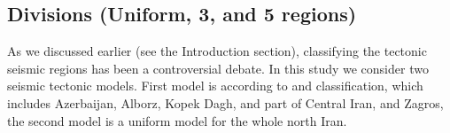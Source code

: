 \subsection{Divisions (Uniform, 3, and 5 regions)}

As we discussed earlier (see the Introduction section), classifying the tectonic seismic regions has been a controversial debate. In this study we consider two seismic tectonic models. First model is according to \citet{Mirzaei1998} and \citet{Karimiparidari2013} classification, which includes Azerbaijan, Alborz, Kopek Dagh, and part of Central Iran, and Zagros, the second model is a uniform model for the whole north Iran.  
